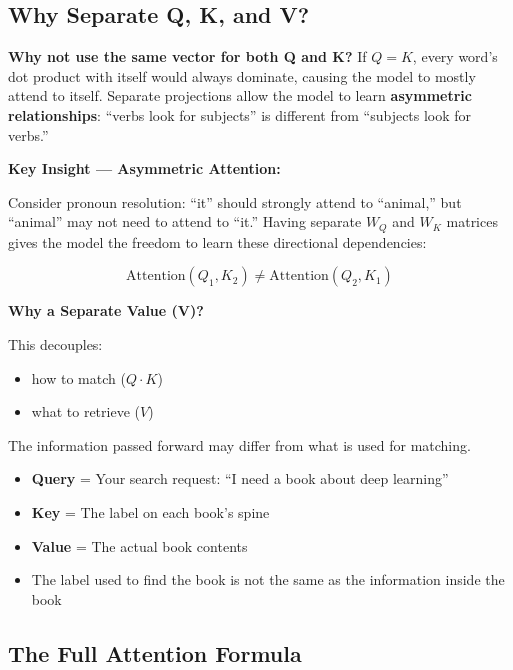 \documentclass[11pt]{article}
\begin{document}
\subsection{Why Separate Q, K, and V?}

\textbf{Why not use the same vector for both Q and K?} If $Q = K$, every word's dot product with itself would always dominate, causing the model to mostly attend to itself. Separate projections allow the model to learn \textbf{asymmetric relationships}: ``verbs look for subjects'' is different from ``subjects look for verbs.''

\medskip

\noindent\textbf{Key Insight --- Asymmetric Attention:}

Consider pronoun resolution: ``it'' should strongly attend to ``animal,'' but ``animal'' may not need to attend to ``it.'' Having separate $W_Q$ and $W_K$ matrices gives the model the freedom to learn these directional dependencies:

\[
\text{Attention}(Q_1, K_2) \neq \text{Attention}(Q_2, K_1)
\]

\noindent\textbf{Why a Separate Value (V)?}

This decouples:

\begin{itemize}[nosep]
\item how to match ($Q \cdot K$)
\item what to retrieve ($V$)
\end{itemize}

The information passed forward may differ from what is used for matching.

\begin{examplebox}

\begin{itemize}[nosep]
  \item \textbf{Query} = Your search request: ``I need a book about deep learning''
  \item \textbf{Key} = The label on each book's spine
  \item \textbf{Value} = The actual book contents
  \item The label used to find the book is not the same as the information inside the book
\end{itemize}

\end{examplebox}

\subsection{The Full Attention Formula}
\end{document}
